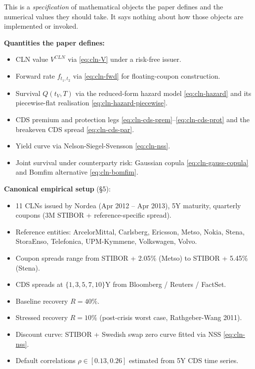 \documentclass[11pt,a4paper]{article}
\begin{document}
\begin{validation}
This is a \emph{specification} of mathematical objects the paper
defines and the numerical values they should take. It says nothing
about how those objects are implemented or invoked.

\textbf{Quantities the paper defines:}
\begin{itemize}[noitemsep]
  \item CLN value $V^{CLN}$ via \eqref{eq:cln-V} under a risk-free
        issuer.
  \item Forward rate $f_{t_1, t_2}$ via \eqref{eq:cln-fwd} for
        floating-coupon construction.
  \item Survival $Q(t_V, T)$ via the reduced-form hazard model
        \eqref{eq:cln-hazard} and its piecewise-flat realisation
        \eqref{eq:cln-hazard-piecewise}.
  \item CDS premium and protection legs
        \eqref{eq:cln-cds-prem}--\eqref{eq:cln-cds-prot} and the
        breakeven CDS spread \eqref{eq:cln-cds-par}.
  \item Yield curve via Nelson-Siegel-Svensson \eqref{eq:cln-nss}.
  \item Joint survival under counterparty risk: Gaussian copula
        \eqref{eq:cln-gauss-copula} and Bomfim alternative
        \eqref{eq:cln-bomfim}.
\end{itemize}

\textbf{Canonical empirical setup} (\S5):
\begin{itemize}[noitemsep]
  \item 11 CLNs issued by Nordea (Apr 2012 -- Apr 2013), 5Y
        maturity, quarterly coupons (3M STIBOR + reference-specific spread).
  \item Reference entities: ArcelorMittal, Carlsberg, Ericsson,
        Metso, Nokia, Stena, StoraEnso, Telefonica, UPM-Kymmene,
        Volkswagen, Volvo.
  \item Coupon spreads range from STIBOR + 2.05\% (Metso) to
        STIBOR + 5.45\% (Stena).
  \item CDS spreads at $\{1, 3, 5, 7, 10\}$Y from Bloomberg / Reuters / FactSet.
  \item Baseline recovery $R = 40\%$.
  \item Stressed recovery $R = 10\%$ (post-crisis worst case, Rathgeber-Wang 2011).
  \item Discount curve: STIBOR + Swedish swap zero curve fitted via NSS \eqref{eq:cln-nss}.
  \item Default correlations $\rho \in [0.13, 0.26]$ estimated from
        5Y CDS time series.
\end{itemize}


\end{validation}
\end{document}
